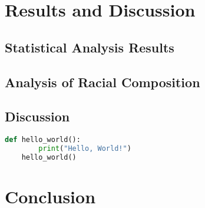 \documentclass{article}
\begin{document}
\section{Results and Discussion}
\subsection{Statistical Analysis Results}
\subsection{Analysis of Racial Composition}
\subsection{Discussion}



    \begin{lstlisting}[language=Python]
    def hello_world():
        print("Hello, World!")
    hello_world()
    \end{lstlisting}
\section{Conclusion}
\end{document}
